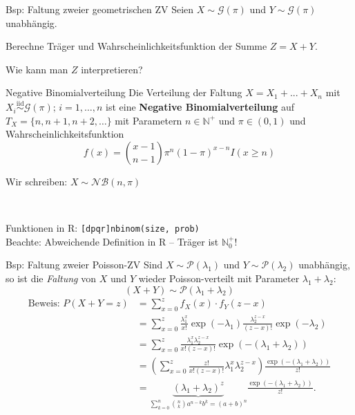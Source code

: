 \documentclass[
  10pt,
  ignorenonframetext,
]{beamer}
\begin{document}
\begin{frame}{Bsp: Faltung zweier geometrischen ZV}
\label{bsp-faltung-zweier-geometrischen-zv}
Seien \(X \sim {\mathcal G}(\pi)\) und \(Y \sim {\mathcal G}(\pi)\)
unabhängig.

Berechne Träger und Wahrscheinlichkeitsfunktion der Summe \(Z=X+Y\).

Wie kann man \(Z\) interpretieren? 
\end{frame}

\begin{frame}[fragile]{Negative Binomialverteilung}
\label{negative-binomialverteilung}
Die Verteilung der Faltung \(X = X_1 + ... + X_n\) mit
\(X_i \stackrel{\text{iid}}{\sim} \mathcal{G}(\pi);\, i= 1, \dots, n\)
ist eine \textbf{Negative Binomialverteilung} auf
\(T_X = \{n, n+1, n+2, \ldots\}\) mit Parametern \(n \in \mathbb{N}^+\)
und \(\pi \in (0,1)\) und Wahrscheinlichkeitsfunktion \[
f(x) = \binom{x - 1}{n - 1} \pi^n (1-\pi)^{x-n} I(x \geq n)
\]

Wir schreiben: \(X\sim \mathcal{NB}(n, \pi)\)\\
\strut ~

Funktionen in R: \texttt{{[}dpqr{]}nbinom(size,\ prob)}\\
Beachte: Abweichende Definition in R -- Träger ist \(\mathbb{N}^+_0\)!
\end{frame}

\begin{frame}{Bsp: Faltung zweier Poisson-ZV}
\label{bsp-faltung-zweier-poisson-zv}
Sind \(X \sim {\mathcal P}(\lambda_1)\) und
\(Y \sim {\mathcal P}(\lambda_2)\) unabhängig, so ist die \emph{Faltung}
von \(X\) und \(Y\) wieder Poisson-verteilt mit Parameter
\(\lambda_1 + \lambda_2\): \[
(X + Y) \sim {\mathcal P}(\lambda_1 + \lambda_2)
\] \begin{align*}
\text{Beweis: }P(X+Y=z) &= \sum^z_{x=0} f_X(x) \cdot f_Y(z - x) \\
&= \sum^z_{x=0} \frac{\lambda_1^x}{x!} \exp(-\lambda_1)\frac{\lambda_2^{z-x}}{(z-x)!} \exp(-\lambda_2) \\
&= \sum^z_{x=0} \frac{\lambda_1^x \lambda_2^{z-x}}{x!(z-x)!}\exp(-(\lambda_1 + \lambda_2)) \\
&= \left(\sum^z_{x=0} \frac{z!}{x!(z-x)!}\lambda_1^x \lambda_2^{z-x}\right)\frac{\exp(-(\lambda_1 + \lambda_2))}{z!} \\
&= \underbrace{(\lambda_1 + \lambda_2)^z}_{\sum^n_{k=0} \binom{n}{k} a^{n-k} b^k = (a+b)^n} \frac{\exp(-(\lambda_1 + \lambda_2))}{z!}.
\end{align*}
\end{frame}
\end{document}
